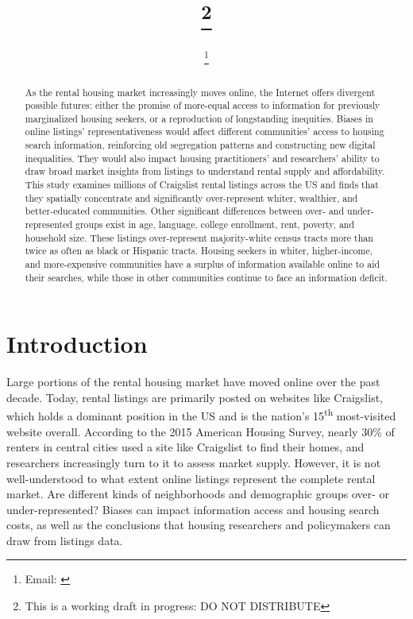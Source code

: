 \documentclass[11pt,onecolumn]{article} %
\begin{document}
	
\title{\papertitle\footnote{This is a working draft in progress: DO NOT DISTRIBUTE}}
\date{\paperdate}
\author[]{\myname \thanks{Email: \href{mailto:\myemail}{\myemail}}}
\affil[]{\myaffiliation}

\maketitle

\begin{abstract}
As the rental housing market increasingly moves online, the Internet offers divergent possible futures: either the promise of more-equal access to information for previously marginalized housing seekers, or a reproduction of longstanding inequities. Biases in online listings' representativeness would affect different communities' access to housing search information, reinforcing old segregation patterns and constructing new digital inequalities. They would also impact housing practitioners' and researchers' ability to draw broad market insights from listings to understand rental supply and affordability. This study examines millions of Craigslist rental listings across the US and finds that they spatially concentrate and significantly over-represent whiter, wealthier, and better-educated communities. Other significant differences between over- and under-represented groups exist in age, language, college enrollment, rent, poverty, and household size. These listings over-represent majority-white census tracts more than twice as often as black or Hispanic tracts. Housing seekers in whiter, higher-income, and more-expensive communities have a surplus of information available online to aid their searches, while those in other communities continue to face an information deficit.
\vspace{1cm}
\end{abstract}




\section{Introduction}

Large portions of the rental housing market have moved online over the past decade. Today, rental listings are primarily posted on websites like Craigslist, which holds a dominant position in the US and is the nation's 15\textsuperscript{th} most-visited website overall. According to the 2015 American Housing Survey, nearly 30\% of renters in central cities used a site like Craigslist to find their homes, and researchers increasingly turn to it to assess market supply. However, it is not well-understood to what extent online listings represent the complete rental market. Are different kinds of neighborhoods and demographic groups over- or under-represented? Biases can impact information access and housing search costs, as well as the conclusions that housing researchers and policymakers can draw from listings data.
\end{document}
